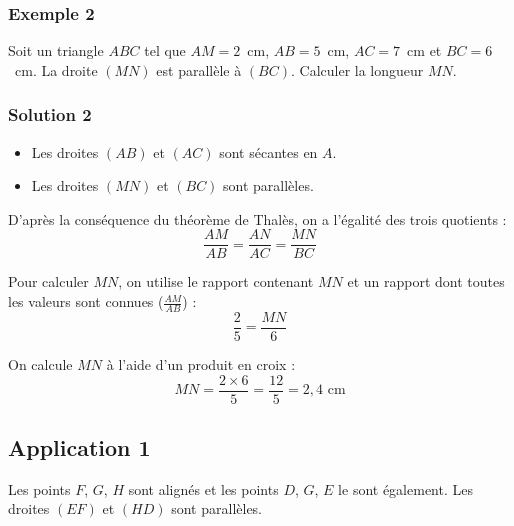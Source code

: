 \documentclass[12pt,a4paper]{article}
\begin{document}
\subsubsection*{\color{myred} Exemple 2}
Soit un triangle $ABC$ tel que $AM = 2$~cm, $AB = 5$~cm, $AC = 7$~cm et $BC = 6$~cm. 
La droite $(MN)$ est parallèle à $(BC)$. Calculer la longueur $MN$.
\begin{center}
\end{center}
\subsubsection*{\color{myred} Solution 2}
\begin{itemize}
    \item Les droites $(AB)$ et $(AC)$ sont sécantes en $A$.
    \item Les droites $(MN)$ et $(BC)$ sont parallèles.
\end{itemize}
D'après la conséquence du théorème de Thalès, on a l'égalité des trois quotients :
$$\frac{AM}{AB} = \frac{AN}{AC} = \frac{MN}{BC}$$

Pour calculer $MN$, on utilise le rapport contenant $MN$ et un rapport dont toutes les valeurs sont connues ($\frac{AM}{AB}$) :
$$\frac{2}{5} = \frac{MN}{6}$$

On calcule $MN$ à l'aide d'un produit en croix :
$$MN = \frac{2 \times 6}{5} = \frac{12}{5} = 2{,}4\text{ cm}$$
\subsection*{\color{myred} Application 1}
Les points $F$, $G$, $H$ sont alignés et les points $D$, $G$, $E$ le sont également. Les droites $(EF)$ et $(HD)$ sont parallèles.
\end{document}
